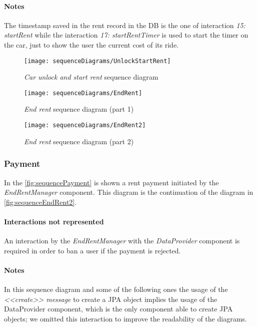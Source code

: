 \paragraph{Notes}
The timestamp saved in the rent record in the DB is the one of interaction \emph{15: startRent} while the interaction \emph{17: startRentTimer} is used to start the timer on the car, just to show the user the current cost of its ride.

\clearpage

\begin{figure}[h!]
	\centering
	\texttt{[image: sequenceDiagrams/UnlockStartRent]}
	\caption{
		\label{fig:sequenceUnlockStartRent} 
		\emph{Car unlock and start rent} sequence diagram
	}
\end{figure}
\begin{figure}[h!]
	\centering
	\texttt{[image: sequenceDiagrams/EndRent]}
	\caption{
		\label{fig:sequenceEndRent1} 
		\emph{End rent} sequence diagram (part 1)
	}
\end{figure}
\begin{figure}[h!]
	\centering
	\texttt{[image: sequenceDiagrams/EndRent2]}
	\caption{
		\label{fig:sequenceEndRent2} 
		\emph{End rent} sequence diagram (part 2)
	}
\end{figure}

\clearpage
\subsubsection{Payment}
In the \autoref{fig:sequencePayment} is shown a rent payment initiated by the \emph{EndRentManager} component. This diagram is the continuation of the diagram in \autoref{fig:sequenceEndRent2}.

\paragraph{Interactions not represented} An interaction by the \emph{EndRentManager} with the \emph{DataProvider} component is required in order to ban a user if the payment is rejected.

\paragraph{Notes}
In this sequence diagram and some of the following ones the usage of the \emph{<<create>> message} to create a JPA object implies the usage of the DataProvider component, which is the only component able to create JPA objects; we omitted this interaction to improve the readability of the diagrams.

